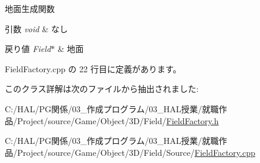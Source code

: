 地面生成関数 


\begin{DoxyParams}{引数}
{\em void} & なし \\
\hline
\end{DoxyParams}

\begin{DoxyRetVals}{戻り値}
{\em Field$\ast$} & 地面 \\
\hline
\end{DoxyRetVals}


 Field\+Factory.\+cpp の 22 行目に定義があります。



このクラス詳解は次のファイルから抽出されました\+:\begin{DoxyCompactItemize}
\item 
C\+:/\+H\+A\+L/\+P\+G関係/03\+\_\+作成プログラム/03\+\_\+\+H\+A\+L授業/就職作品/\+Project/source/\+Game/\+Object/3\+D/\+Field/\mbox{\hyperlink{_field_factory_8h}{Field\+Factory.\+h}}\item 
C\+:/\+H\+A\+L/\+P\+G関係/03\+\_\+作成プログラム/03\+\_\+\+H\+A\+L授業/就職作品/\+Project/source/\+Game/\+Object/3\+D/\+Field/\+Source/\mbox{\hyperlink{_field_factory_8cpp}{Field\+Factory.\+cpp}}\end{DoxyCompactItemize}
